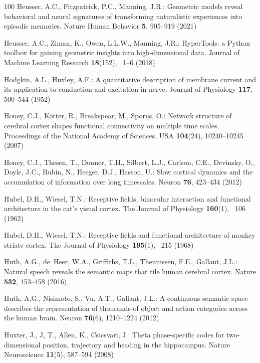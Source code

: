 \documentclass{llmxive}
\begin{document}
\begin{thebibliography}{100}
Heusser, A.C., Fitzpatrick, P.C., Manning, J.R.: Geometric models reveal
  behavioral and neural signatures of transforming naturalistic experiences
  into episodic memories. Nature Human Behavior  \textbf{5},  905--919 (2021)

Heusser, A.C., Ziman, K., Owen, L.L.W., Manning, J.R.: {HyperTools}: a {Python}
  toolbox for gaining geometric insights into high-dimensional data. Journal of
  Machine Learning Research  \textbf{18}(152), ~1--6 (2018)

Hodgkin, A.L., Huxley, A.F.: A quantitative description of membrane current and
  its application to conduction and excitation in nerve. Journal of Physiology
  \textbf{117},  500--544 (1952)

Honey, C.J., K\"{o}tter, R., Breakspear, M., Sporns, O.: Network structure of
  cerebral cortex shapes functional connectivity on multiple time scales.
  Proceedings of the National Academy of Sciences, {USA}  \textbf{104}(24),
  10240--10245 (2007)

Honey, C.J., Thesen, T., Donner, T.H., Silbert, L.J., Carlson, C.E., Devinsky,
  O., Doyle, J.C., Rubin, N., Heeger, D.J., Hasson, U.: Slow cortical dynamics
  and the accumulation of information over long timescales. Neuron
  \textbf{76},  423--434 (2012)

Hubel, D.H., Wiesel, T.N.: Receptive fields, binocular interaction and
  functional architecture in the cat's visual cortex. The Journal of Physiology
   \textbf{160}(1), ~106 (1962)

Hubel, D.H., Wiesel, T.N.: Receptive fields and functional architecture of
  monkey striate cortex. The Journal of Physiology  \textbf{195}(1), ~215
  (1968)

Huth, A.G., de~Heer, W.A., Griffiths, T.L., Theunissen, F.E., Gallant, J.L.:
  Natural speech reveals the semantic maps that tile human cerebral cortex.
  Nature  \textbf{532},  453--458 (2016)

Huth, A.G., Nisimoto, S., Vu, A.T., Gallant, J.L.: A continuous semantic space
  describes the representation of thousands of object and action categories
  across the human brain. Neuron  \textbf{76}(6),  1210--1224 (2012)

Huxter, J., J, T., Allen, K., Csicsvari, J.: Theta phase-specific codes for
  two-dimensional position, trajectory and heading in the hippocampus. Nature
  Neuroscience  \textbf{11}(5),  587--594 (2008)


\end{thebibliography}
\end{document}
